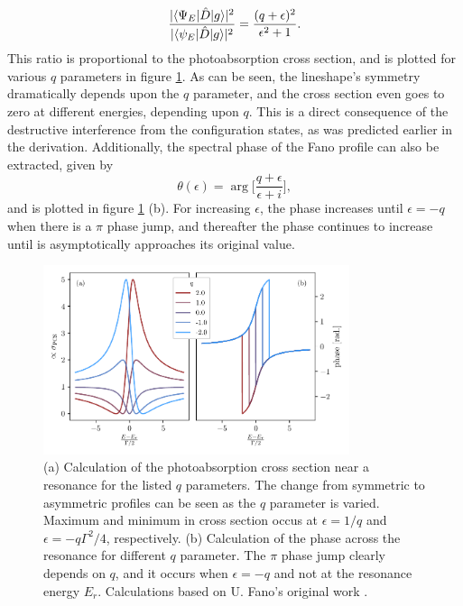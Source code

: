 \begin{equation}
\label{eqn:transition_prob_ratio}
	\frac{\lvert \braket{\Psi_E|\hat{D}|g} \rvert^2}{\lvert \braket{\psi_E|\hat{D}|g} \rvert^2}=\frac{(q+\epsilon)^2}{\epsilon^2 + 1}.
\end{equation}
This ratio is proportional to the photoabsorption cross section, and is plotted for various $q$ parameters in figure \ref{fig:cross_sec_and_phase}.  As can be seen, the lineshape's symmetry dramatically depends upon the $q$ parameter, and the cross section even goes to zero at different energies, depending upon $q$. This is a direct consequence of the destructive interference from the configuration states, as was predicted earlier in the derivation. Additionally, the spectral phase of the Fano profile can also be extracted, given by 
\begin{equation}
	\theta(\epsilon)=\arg\bigg[\frac{q+\epsilon}{\epsilon+i}\bigg],
\end{equation}
and is plotted in figure \ref{fig:cross_sec_and_phase} (b).  For increasing $\epsilon$, the phase increases until $\epsilon=-q$ when there is a $\pi$ phase jump, and thereafter the phase continues to increase until is asymptotically approaches its original value.
\begin{figure}
	\centering
	\includegraphics[width=0.8\textwidth]{figures/ATS/cs_phase.pdf}
	\caption[Photoabsorption cross section and phase of a Fano resonance]{(a) Calculation of the photoabsorption cross section near a resonance for the listed $q$ parameters.  The change from symmetric to asymmetric profiles can be seen as the $q$ parameter is varied. Maximum and minimum in cross section occus at $\epsilon=1/q$ and $\epsilon=-q\Gamma^2/4$, respectively. (b) Calculation of the phase across the resonance for different $q$ parameter. The $\pi$ phase jump clearly depends on $q$, and it occurs when $\epsilon=-q$ and not at the resonance energy $E_r$. Calculations based on U. Fano's original work \cite{fanoEffectsConfigurationInteraction1961}.}
	\label{fig:cross_sec_and_phase}
\end{figure}

